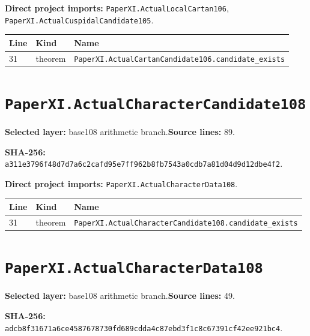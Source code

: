 \documentclass[10pt,oneside]{book}
\begin{document}

\textbf{Direct project imports:} \nolinkurl{PaperXI.ActualLocalCartan106}, \nolinkurl{PaperXI.ActualCuspidalCandidate105}.

\begin{longtable}{@{}p{}p{}p{}@{}}\toprule Line&Kind&Name\\\midrule\endhead

31&theorem&\nolinkurl{PaperXI.ActualCartanCandidate106.candidate_exists}\\

\bottomrule\end{longtable}

\section{\texorpdfstring{\nolinkurl{PaperXI.ActualCharacterCandidate108}}{PaperXI.ActualCharacterCandidate108}}\label{module:PaperXI.ActualCharacterCandidate108}

\textbf{Selected layer:} base108 arithmetic branch.\quad\textbf{Source lines:} 89.\par\textbf{SHA-256:} {\scriptsize\nolinkurl{a311e3796f48d7d7a6c2cafd95e7ff962b8fb7543a0cdb7a81d04d9d12dbe4f2}}.


\textbf{Direct project imports:} \nolinkurl{PaperXI.ActualCharacterData108}.

\begin{longtable}{@{}p{}p{}p{}@{}}\toprule Line&Kind&Name\\\midrule\endhead

31&theorem&\nolinkurl{PaperXI.ActualCharacterCandidate108.candidate_exists}\\

\bottomrule\end{longtable}

\section{\texorpdfstring{\nolinkurl{PaperXI.ActualCharacterData108}}{PaperXI.ActualCharacterData108}}\label{module:PaperXI.ActualCharacterData108}

\textbf{Selected layer:} base108 arithmetic branch.\quad\textbf{Source lines:} 49.\par\textbf{SHA-256:} {\scriptsize\nolinkurl{adcb8f31671a6ce4587678730fd689cdda4c87ebd3f1c8c67391cf42ee921bc4}}.
\end{document}
